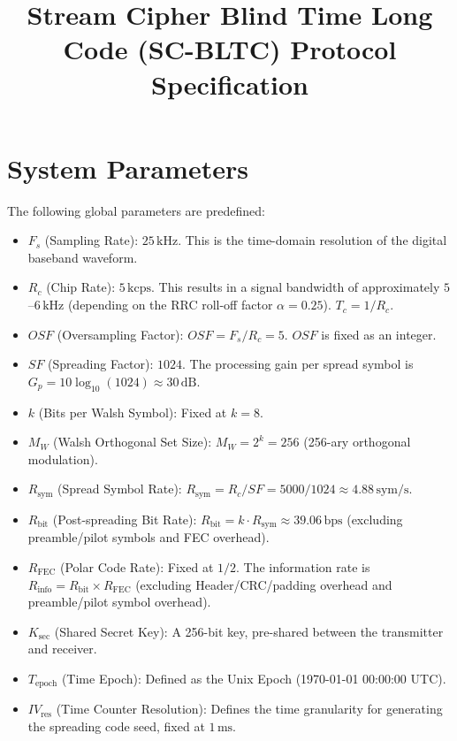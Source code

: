 \documentclass[11pt]{article}
\title{Stream Cipher Blind Time Long Code (SC-BLTC) Protocol Specification}
\date{}
\begin{document}
\maketitle
\tableofcontents

\section{System Parameters}

The following global parameters are predefined:

\begin{itemize}
\item $F_s$ (Sampling Rate): $25\,\text{kHz}$. This is the time-domain resolution of the digital baseband waveform.
\item $R_c$ (Chip Rate): $5\,\text{kcps}$. This results in a signal bandwidth of approximately $5$--$6\,\text{kHz}$ (depending on the RRC roll-off factor $\alpha=0.25$). $T_c = 1/R_c$.
\item $\mathit{OSF}$ (Oversampling Factor): $\mathit{OSF} = F_s / R_c = 5$. $\mathit{OSF}$ is fixed as an integer.
\item $\mathit{SF}$ (Spreading Factor): $1024$. The processing gain per spread symbol is $G_p = 10\log_{10}(1024) \approx 30\,\text{dB}$.
\item $k$ (Bits per Walsh Symbol): Fixed at $k=8$.
\item $M_W$ (Walsh Orthogonal Set Size): $M_W=2^k=256$ (256-ary orthogonal modulation).
\item $R_{\text{sym}}$ (Spread Symbol Rate): $R_{\text{sym}}=R_c/\mathit{SF}=5000/1024\approx 4.88\,\text{sym/s}$.
\item $R_{\text{bit}}$ (Post-spreading Bit Rate): $R_{\text{bit}}=k\cdot R_{\text{sym}}\approx 39.06\,\text{bps}$ (excluding preamble/pilot symbols and FEC overhead).
\item $R_{\text{FEC}}$ (Polar Code Rate): Fixed at $1/2$. The information rate is $R_{\text{info}} = R_{\text{bit}} \times R_{\text{FEC}}$ (excluding Header/CRC/padding overhead and preamble/pilot symbol overhead).
\item $K_{\text{sec}}$ (Shared Secret Key): A 256-bit key, pre-shared between the transmitter and receiver.
\item $T_{\text{epoch}}$ (Time Epoch): Defined as the Unix Epoch (1970-01-01 00:00:00 UTC).
\item $\mathit{IV}_{\text{res}}$ (Time Counter Resolution): Defines the time granularity for generating the spreading code seed, fixed at $1\,\text{ms}$.

\end{itemize}
\end{document}
